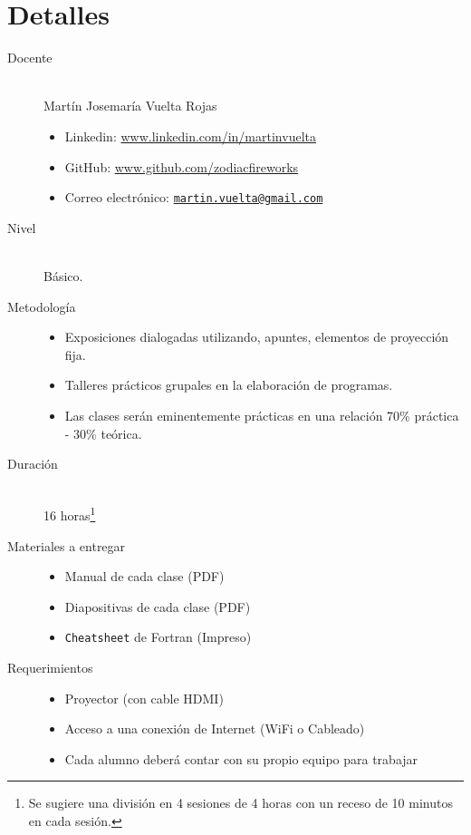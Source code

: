 \section{Detalles}


\begin{description}
  \item[Docente]\hfill\\
    Martín Josemaría Vuelta Rojas

    \begin{itemize}
      \item Linkedin: \url{www.linkedin.com/in/martinvuelta}
      \item GitHub: \url{www.github.com/zodiacfireworks}
      \item Correo electrónico: \href{mailto:martin.vuelta@gmail.com}{\texttt{martin.vuelta@gmail.com}}
    \end{itemize}

  \item[Nivel]\hfill\\
    Básico.

  \item[Metodología]\hfill
    \begin{itemize}
      \item Exposiciones dialogadas utilizando, apuntes, elementos de proyección fija.
      \item Talleres prácticos grupales en la elaboración de programas.
      \item Las clases serán eminentemente prácticas en una relación 70\% práctica - 30\% teórica.
    \end{itemize}

  \item[Duración]\hfill\\
    16 horas\footnote{Se sugiere una división en 4 sesiones de 4 horas con un receso de 10 minutos en cada sesión.}

  \item[Materiales a entregar]\hfill
    \begin{itemize}
      \item Manual de cada clase (PDF)
      \item Diapositivas de cada clase (PDF)
      \item \texttt{Cheatsheet} de Fortran (Impreso)
    \end{itemize}

  \item[Requerimientos]\hfill
    \begin{itemize}
      \item Proyector (con cable HDMI)
      \item Acceso a una conexión de Internet (WiFi o Cableado)
      \item Cada alumno deberá contar con su propio equipo para trabajar
    \end{itemize}
\end{description}
